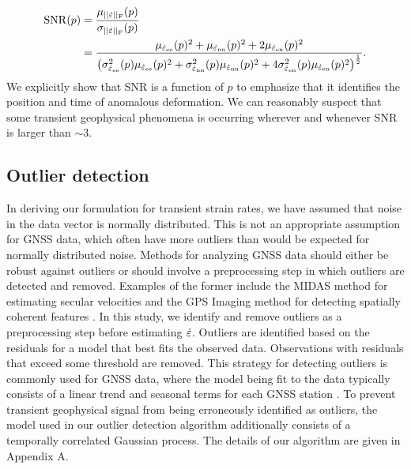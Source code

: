 \documentclass[extra,mreferee]{gji}
\begin{document}
\begin{align}\label{eq:SNR}
\mathrm{SNR}(p) &= \frac{\mu_{||\dot\varepsilon||_\mathrm{F}}(p)}{\sigma_{||\dot\varepsilon||_\mathrm{F}}(p)} \nonumber \\
                &= \frac{\mu_{\dot\varepsilon_{\mathrm{e}\mathrm{e}}}(p)^2 +
                         \mu_{\dot\varepsilon_{\mathrm{n}\mathrm{n}}}(p)^2 +
                         2\mu_{\dot\varepsilon_{\mathrm{e}\mathrm{n}}}(p)^2}
                        {\big(\sigma^2_{\dot\varepsilon_{\mathrm{e}\mathrm{e}}}(p)\mu_{\dot\varepsilon_{\mathrm{e}\mathrm{e}}}(p)^2 + 
                              \sigma^2_{\dot\varepsilon_{\mathrm{n}\mathrm{n}}}(p)\mu_{\dot\varepsilon_{\mathrm{n}\mathrm{n}}}(p)^2 + 
                              4\sigma^2_{\dot\varepsilon_{\mathrm{e}\mathrm{n}}}(p)\mu_{\dot\varepsilon_{\mathrm{e}\mathrm{n}}}(p)^2
                         \big)^{\frac{1}{2}}}.
\end{align}
We explicitly show that SNR is a function of $p$ to emphasize that it
identifies the position and time of anomalous deformation. We can
reasonably suspect that some transient geophysical phenomena is
occurring wherever and whenever SNR is larger than ${\sim}3$.

\subsection{Outlier detection}\label{sec:Outlier}


In deriving our formulation for transient strain rates, we have
assumed that noise in the data vector is normally distributed. This is
not an appropriate assumption for GNSS data, which often have more
outliers than would be expected for normally distributed noise.
Methods for analyzing GNSS data should either be robust against
outliers or should involve a preprocessing step in which outliers are
detected and removed. Examples of the former include the MIDAS method
for estimating secular velocities \citep{Blewitt2016} and the GPS
Imaging method for detecting spatially coherent features
\citep{Hammond2016}. In this study, we identify and remove outliers as
a preprocessing step before estimating $\dot\varepsilon$. Outliers are
identified based on the residuals for a model that best fits the
observed data. Observations with residuals that exceed some threshold
are removed. This strategy for detecting outliers is commonly used for
GNSS data, where the model being fit to the data typically consists of
a linear trend and seasonal terms for each GNSS station
\citep[e.g.,][]{Johansson2002,Dong2006,Bos2013}. To prevent transient
geophysical signal from being erroneously identified as outliers, the
model used in our outlier detection algorithm additionally consists of
a temporally correlated Gaussian process. The details of our algorithm
are given in Appendix A.
\end{document}
